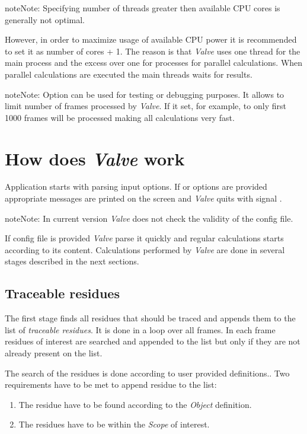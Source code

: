 \documentclass[a4paper,10pt,english]{sphinxmanual}
\begin{document}
\begin{notice}{note}{Note:}
Specifying number of threads greater then available CPU cores is generally not optimal.

However, in order to maximize usage of available CPU power it is recommended to set it as number of cores + 1. The reason is that \emph{Valve} uses one thread for the main process and the excess over one for processes for parallel calculations. When parallel calculations are executed the main threads waits for results.
\end{notice}

\begin{notice}{note}{Note:}
Option  can be used for testing or debugging purposes. It allows to limit number of frames processed by \emph{Valve}.
If it set, for example, to  only first 1000 frames will be processed making all calculations very fast.
\end{notice}


\section{How does \emph{Valve} work}
\label{valve/valve_manual:how-does-valve-work}
Application starts with parsing input options. If  or  options are provided appropriate messages are printed on the screen and \emph{Valve} quits with signal .

\begin{notice}{note}{Note:}
In current version \emph{Valve} does not check the validity of the config file.
\end{notice}

If config file is provided \emph{Valve} parse it quickly and regular calculations starts according to its content. Calculations performed by \emph{Valve} are done in several stages described in the next sections.


\subsection{Traceable residues}
\label{valve/valve_manual:traceable-residues}
The first stage finds all residues that should be traced and appends them to the list of \emph{traceable residues}. It is done in a loop over all frames. In each frame residues of interest are searched and appended to the list but only if they are not already present on the list.

The search of the residues is done according to user provided definitions.. Two requirements have to be met to append residue to the list:
\begin{enumerate}
\item {} 
The residue have to be found according to the \emph{Object} definition.

\item {} 
The residues have to be within the \emph{Scope} of interest.

\end{enumerate}
\end{document}
